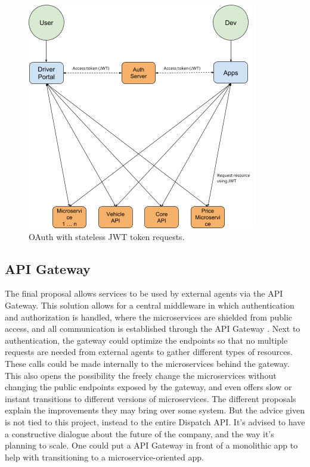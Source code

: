 \begin{figure}[H]
	\centering
	\includegraphics[width=.7\textwidth]{Auth2}
	\caption[Stateless JWT]{OAuth with stateless JWT token requests.}
	\label{fig:Auth2}
\end{figure}

\subsection{API Gateway}
The final proposal allows services to be used by external agents via the API Gateway. This solution allows for a central middleware in which authentication and authorization is handled, where the microservices are shielded from public access, and all communication is established through the API Gateway \cite{api-gateway}. Next to authentication, the gateway could optimize the endpoints so that no multiple requests are needed from external agents to gather different types of resources. These calls could be made internally to the microservices behind the gateway. This also opens the possibility the freely change the microservices without changing the public endpoints exposed by the gateway, and even offers slow or instant transitions to different versions of microservices. The different proposals explain the improvements they may bring over some system. But the advice given is not tied to this project, instead to the entire Dispatch API. It’s advised to have a constructive dialogue about the future of the company, and the way it’s planning to scale. One could put a API Gateway in front of a monolithic app to help with transitioning to a microservice-oriented app.

